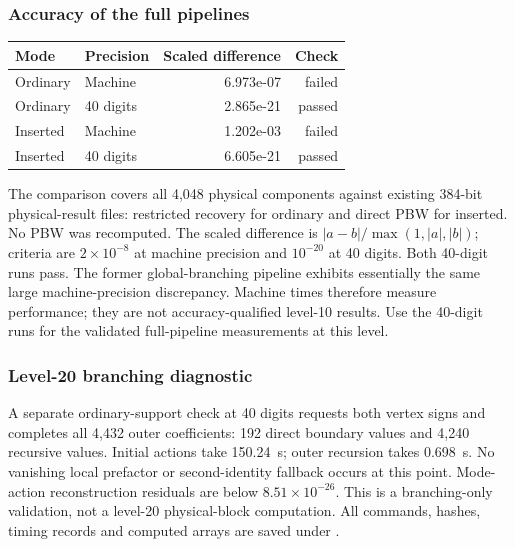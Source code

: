 \subsubsection*{Accuracy of the full pipelines}
\begin{center}\small
\begin{tabular}{@{}llrr@{}}
\toprule
Mode & Precision & Scaled difference & Check \\
\midrule
Ordinary & Machine & 6.973e-07 & failed \\
Ordinary & 40 digits & 2.865e-21 & passed \\
Inserted & Machine & 1.202e-03 & failed \\
Inserted & 40 digits & 6.605e-21 & passed \\
\bottomrule
\end{tabular}
\end{center}
The comparison covers all 4,048 physical components against existing 384-bit
physical-result files: restricted recovery for ordinary and direct PBW for
inserted. No PBW was recomputed. The scaled difference is
$|a-b|/\max(1,|a|,|b|)$; criteria are $2\times10^{-8}$ at machine precision
and $10^{-20}$ at 40 digits. Both 40-digit runs pass.
The former global-branching pipeline exhibits essentially the same large
machine-precision discrepancy. Machine times therefore measure performance;
they are not accuracy-qualified level-10 results. Use the 40-digit runs
for the validated full-pipeline measurements at this level.
\subsubsection*{Level-20 branching diagnostic}
A separate ordinary-support check at 40 digits requests both vertex signs and
completes all 4,432 outer coefficients: 192 direct boundary values and 4,240
recursive values. Initial actions take 150.24~s; outer recursion takes 0.698~s.
No vanishing local prefactor or second-identity fallback occurs at this point.
Mode-action reconstruction residuals are below $8.51\times10^{-26}$.
This is a branching-only validation, not a level-20 physical-block computation.
All commands, hashes, timing records and computed arrays are saved under
.

